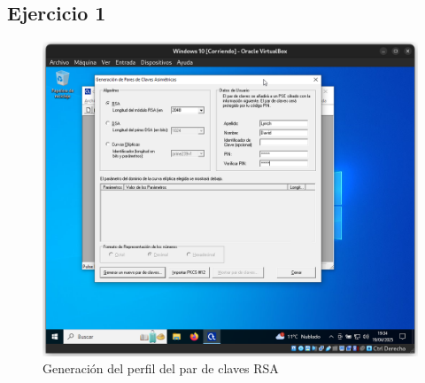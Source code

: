 \subsection{Ejercicio 1}
\graphicspath{ {img/1} }

\begin{figure}[h]
    \includegraphics[width=15cm]{ClavesRSA-01.png}
    \caption{Generación del perfil del par de claves RSA}
\end{figure}


